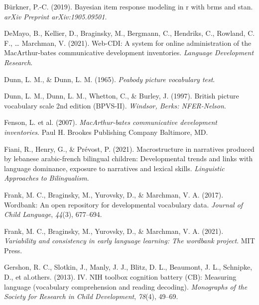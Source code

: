 \documentclass[
  man,floatsintext]{apa6}
\newlength{\cslhangindent}
\newlength{\cslentryspacingunit} %
\newenvironment{CSLReferences}[2] %
 {%
  \setlength{\parindent}{0pt}
  \ifodd #1
  \let\oldpar\par
  \def\par{\hangindent=\cslhangindent\oldpar}
  \fi
  \setlength{\parskip}{#2\cslentryspacingunit}
 }%
 {}
\begin{document}
\begin{CSLReferences}{1}{0}
\leavevmode{}%
Bürkner, P.-C. (2019). Bayesian item response modeling in r with brms and stan. \emph{arXiv Preprint arXiv:1905.09501}.

\leavevmode{}%
DeMayo, B., Kellier, D., Braginsky, M., Bergmann, C., Hendriks, C., Rowland, C. F., \ldots{} Marchman, V. (2021). Web-CDI: A system for online administration of the MacArthur-bates communicative development inventories. \emph{Language Development Research}.

\leavevmode{}%
Dunn, L. M., \& Dunn, L. M. (1965). \emph{Peabody picture vocabulary test}.

\leavevmode{}%
Dunn, L. M., Dunn, L. M., Whetton, C., \& Burley, J. (1997). British picture vocabulary scale 2nd edition (BPVS-II). \emph{Windsor, Berks: NFER-Nelson}.

\leavevmode{}%
Fenson, L. et al. (2007). \emph{MacArthur-bates communicative development inventories}. Paul H. Brookes Publishing Company Baltimore, MD.

\leavevmode{}%
Fiani, R., Henry, G., \& Prévost, P. (2021). Macrostructure in narratives produced by lebanese arabic-french bilingual children: Developmental trends and links with language dominance, exposure to narratives and lexical skills. \emph{Linguistic Approaches to Bilingualism}.

\leavevmode{}%
Frank, M. C., Braginsky, M., Yurovsky, D., \& Marchman, V. A. (2017). Wordbank: An open repository for developmental vocabulary data. \emph{Journal of Child Language}, \emph{44}(3), 677--694.

\leavevmode{}%
Frank, M. C., Braginsky, M., Yurovsky, D., \& Marchman, V. A. (2021). \emph{Variability and consistency in early language learning: The wordbank project}. MIT Press.

\leavevmode{}%
Gershon, R. C., Slotkin, J., Manly, J. J., Blitz, D. L., Beaumont, J. L., Schnipke, D., et al.others. (2013). IV. NIH toolbox cognition battery (CB): Measuring language (vocabulary comprehension and reading decoding). \emph{Monographs of the Society for Research in Child Development}, \emph{78}(4), 49--69.


\end{CSLReferences}
\end{document}
